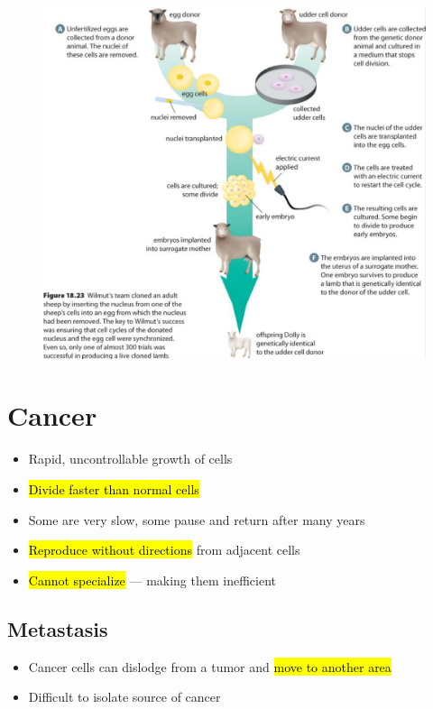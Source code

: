 \documentclass[a4paper,12pt]{article}
\begin{document}
\begin{figure}[H]
    \centering
    \includegraphics[width=\textwidth]{clone2}
\end{figure}

\pagebreak

\section{Cancer}
\begin{itemize}
    \item{Rapid, uncontrollable growth of cells}
    \item{\hl{Divide faster than normal cells}}
    \item{Some are very slow, some pause and return after many years}
    \item{\hl{Reproduce without directions} from adjacent cells}
    \item{\hl{Cannot specialize} --- making them inefficient}
\end{itemize}

\subsection{Metastasis}
\begin{itemize}
    \item{Cancer cells can dislodge from a tumor and \hl{move to another area}}
    \item{Difficult to isolate source of cancer}
\end{itemize}
\end{document}
